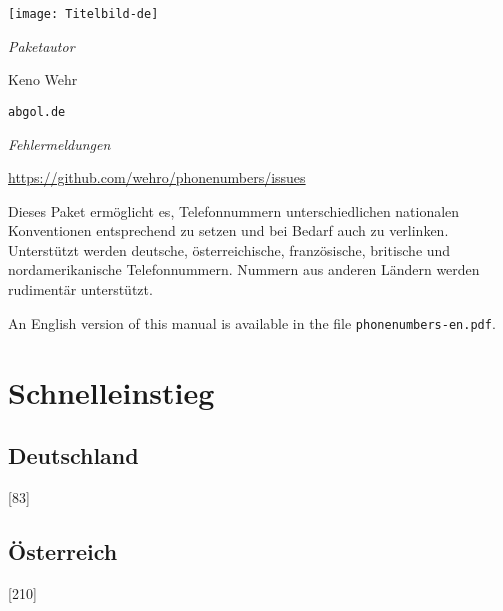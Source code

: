 \documentclass[numbers=noenddot]{scrreprt}
\newcommand\EMailDomain{abgol}
\newcommand\EMailTopLevelDomain{de}
\begin{document}
\begin{titlepage}
\begin{center}
\texttt{[image: Titelbild-de]}

\vfill
\large
\textit{Paketautor}

\smallskip
Keno Wehr

\normalsize
\texttt{\EMail@\EMailDomain.\EMailTopLevelDomain}

\bigskip
\large
\textit{Fehlermeldungen}

\smallskip
\normalsize
\url{https://github.com/wehro/phonenumbers/issues}
\end{center}

\bigskip
\noindent Dieses Paket ermöglicht es, Telefonnummern unterschiedlichen nationalen Konventionen entsprechend zu setzen und bei Bedarf auch zu verlinken. Unterstützt werden deutsche, österreichische, französische, britische und nordamerikanische Telefonnummern. Nummern aus anderen Ländern werden rudimentär unterstützt.

\bigskip
\noindent An English version of this manual is available in the file \texttt{phonenumbers-en.pdf}.
\end{titlepage}

\tableofcontents


\chapter{Schnelleinstieg}
\section{Deutschland}
\begin{sidebyside}
  [83]
\end{sidebyside}
\begin{sidebyside}
\end{sidebyside}
\begin{sidebyside}
\end{sidebyside}
\begin{sidebyside}
\end{sidebyside}

\section{Österreich}
\begin{sidebyside}
  [210]
\end{sidebyside}
\end{document}
